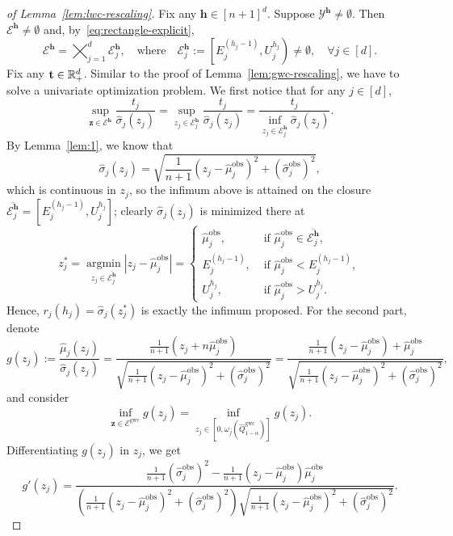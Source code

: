 \begin{proof}[of Lemma~\ref{lem:lwc-rescaling}]
Fix any $\mathbf{h} \in [n+1]^d$.
Suppose $\mathcal{Y}^{\mathbf{h}} \neq \emptyset$. Then $\mathcal{E}^{\mathbf{h}} \neq \emptyset$ and,
by~\eqref{eq:rectangle-explicit},
\[
\mathcal{E}^{\mathbf{h}} = \bigtimes_{j=1}^{d} \mathcal{E}^{\mathbf{h}}_j,
\quad\text{where}\quad
\mathcal{E}^{\mathbf{h}}_j :=\left[E^{(h_j-1)}_j, U^{h_j}_j\right) \neq \emptyset, \quad \forall j \in [d].
\]
Fix any $\mathbf t \in \mathbb{R}^d_+$. Similar to the proof of Lemma~\ref{lem:gwc-rescaling}, we have to solve a univariate optimization problem. We first notice that for any $j \in [d]$,
\[
\sup_{\mathbf z \in \mathcal{E}^{\mathbf{h}}} \frac{t_j}{\hat{\sigma}_{j}(z_j)}= \sup_{z_j \in \mathcal{E}^{\mathbf{h}}_j} \frac{t_j}{\hat{\sigma}_{j}(z_j)} = \frac{t_j}{\inf_{z_j \in \mathcal{E}^{\mathbf{h}}_j}\hat{\sigma}_{j}(z_j)}.
\]
By Lemma~\ref{lem:1}, we know that
\[
\hat{\sigma}_{j}(z_j) = \sqrt{\frac{1}{n+1}(z_j - \hat{\mu}^\mathrm{obs}_j)^2 + (\hat{\sigma}^\mathrm{obs}_j)^2},
\]
which is continuous in $z_j$, so the infimum above is attained on the closure $\overline{\mathcal{E}^{\mathbf{h}}_j} = \left[E^{(h_j-1)}_j, U^{h_j}_j\right]$; clearly $\hat{\sigma}_{j}(z_j)$ is minimized there at 
\[
z^*_j = \operatorname*{argmin}_{z_j \in \overline{\mathcal{E}^{\mathbf{h}}_j}}|z_j-\hat{\mu}^\mathrm{obs}_j| = \begin{cases}
    \hat{\mu}^\mathrm{obs}_j, &\text{ if }\hat{\mu}^\mathrm{obs}_j \in \overline{\mathcal{E}^{\mathbf{h}}_j},\\
    E^{(h_j-1)}_j, &\text{ if } \hat{\mu}^\mathrm{obs}_j< E^{(h_j-1)}_j,\\
    U^{h_j}_j, &\text{ if }\hat{\mu}^\mathrm{obs}_j >  U^{h_j}_j.
\end{cases}
\]
Hence, $r_j(h_j) = \hat{\sigma}_{j}(z^*_j)$ is exactly the infimum proposed. 
\noindent
For the second part, denote
\[
g(z_j):=\frac{\hat{\mu}_{j}(z_j)}{\hat{\sigma}_{j}(z_j)} 
= \frac{\tfrac{1}{n+1}(z_j+n\hat{\mu}^\mathrm{obs}_j)}{\sqrt{\tfrac{1}{n+1}(z_j-\hat{\mu}^\mathrm{obs}_j)^2+(\hat{\sigma}^\mathrm{obs}_j)^2}}=\frac{\tfrac{1}{n+1}(z_j-\hat{\mu}^\mathrm{obs}_j)+\hat{\mu}^\mathrm{obs}_j}{\sqrt{\tfrac{1}{n+1}(z_j-\hat{\mu}^\mathrm{obs}_j)^2+(\hat{\sigma}^\mathrm{obs}_j)^2}},
\]
and consider
\[
\inf_{\mathbf z \in \mathcal{E}^{\mathrm{gwc}}}g(z_j) = \inf_{z_j \in [0, \omega_j(\hat{Q}^{\mathrm{gwc}}_{1-\alpha})]}g(z_j).
\]
Differentiating $g(z_j)$ in $z_j$, we get
\[
g'(z_j) = \frac{\frac{1}{n+1}(\hat{\sigma}^\mathrm{obs}_j)^2-\frac{1}{n+1}(z_j-\hat{\mu}^\mathrm{obs}_j)\hat{\mu}^\mathrm{obs}_j}{(\tfrac{1}{n+1}(z_j-\hat{\mu}^\mathrm{obs}_j)^2+(\hat{\sigma}^\mathrm{obs}_j)^2)\sqrt{\tfrac{1}{n+1}(z_j-\hat{\mu}^\mathrm{obs}_j)^2+(\hat{\sigma}^\mathrm{obs}_j)^2}}.
\]
\end{proof}
